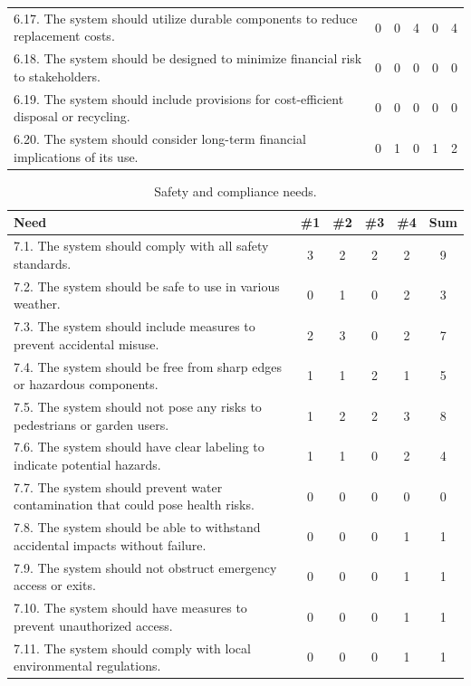 \documentclass[12pt]{report}
\begin{document}
\begin{table}[H]
\begin{tabular}{|p{10cm}|c|c|c|c|c|}
6.17. The system should utilize durable components to reduce replacement costs. & 0 & 0 & 4 & 0 & 4 \\
6.18. The system should be designed to minimize financial risk to stakeholders. & 0 & 0 & 0 & 0 & 0 \\
6.19. The system should include provisions for cost-efficient disposal or recycling. & 0 & 0 & 0 & 0 & 0 \\
6.20. The system should consider long-term financial implications of its use. & 0 & 1 & 0 & 1 & 2 \\
\hline
\end{tabular}
\end{table}

\renewcommand{\thetable}{\thechapter.1g}
\newpage
\begin{table}[H]
\centering
\caption{Safety and compliance needs.}
\label{table:1g}
\begin{tabular}{|p{10cm}|c|c|c|c|c|}
\hline
\textbf{Need} & \textbf{\#1} & \textbf{\#2} & \textbf{\#3} & \textbf{\#4} & \textbf{Sum} \\
\hline
7.1. The system should comply with all safety standards. & 3 & 2 & 2 & 2 & \cellcolor{yellow}9 \\
7.2. The system should be safe to use in various weather. & 0 & 1 & 0 & 2 & 3 \\
7.3. The system should include measures to prevent accidental misuse. & 2 & 3 & 0 & 2 & 7 \\
7.4. The system should be free from sharp edges or hazardous components. & 1 & 1 & 2 & 1 & 5 \\
7.5. The system should not pose any risks to pedestrians or garden users. & 1 & 2 & 2 & 3 & \cellcolor{yellow}8 \\
7.6. The system should have clear labeling to indicate potential hazards. & 1 & 1 & 0 & 2 & 4 \\
7.7. The system should prevent water contamination that could pose health risks. & 0 & 0 & 0 & 0 & 0 \\
7.8. The system should be able to withstand accidental impacts without failure. & 0 & 0 & 0 & 1 & 1 \\
7.9. The system should not obstruct emergency access or exits. & 0 & 0 & 0 & 1 & 1 \\
7.10. The system should have measures to prevent unauthorized access. & 0 & 0 & 0 & 1 & 1 \\
7.11. The system should comply with local environmental regulations. & 0 & 0 & 0 & 1 & 1 \\

\end{tabular}
\end{table}
\end{document}
